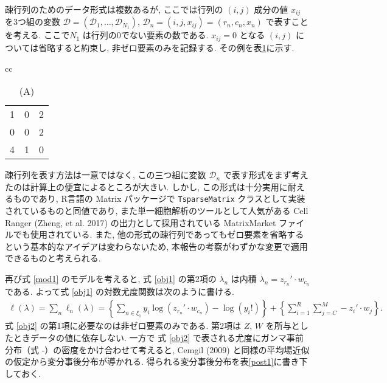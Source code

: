 \documentclass[a4paper,12pt]{jsarticle} %
\numberwithin{equation}{section} %
\begin{document}
疎行列のためのデータ形式は複数あるが, ここでは行列の $(i,j)$ 成分の値 $x_{ij}$ を3つ組の変数 $\mathcal{D}=(\mathcal{D}_1, \ldots, \mathcal{D}_{N_1})$,  $ \mathcal{D}_n  = (i,j,x_{ij})=(r_n, c_n, x_n)$ で表すことを考える. ここで$N_1$ は行列の0でない要素の数である.  $x_{ij}=0$ となる $(i,j)$ については省略すると約束し, 非ゼロ要素のみを記録する. その例を表\ref{tab1}に示す. 
\begin{table}[tbp]
\centering
\caption{疎行列の例. (A)と(B)は同じ情報を持つ. (B)は本研究で扱う疎行列の形式である. }\label{tab1}
\begin{tabular}{cc}
\begin{subtable}{0.2\linewidth}\centering
{
\caption*{(A)}
\begin{tabular}{|ccc|}
\hline
1 & 0 & 2\\
0 & 0 & 2\\
4 & 1 & 0\\
\hline
\end{tabular}
}
\end{subtable}
\begin{subtable}{0.2\linewidth}
\end{subtable}
\end{tabular}
\end{table}
疎行列を表す方法は一意ではなく, この三つ組に変数 $\mathcal{D}_n$ で表す形式をまず考えたのは計算上の便宜によるところが大きい. しかし, この形式は十分実用に耐えるものであり, R言語の Matrix パッケージで \verb|TsparseMatrix| クラスとして実装されているものと同値であり, また単一細胞解析のツールとして人気がある Cell Ranger (Zheng, et al. 2017) の出力として採用されている MatrixMarket ファイルでも使用されている. また, 他の形式の疎行列であってもゼロ要素を省略するという基本的なアイデアは変わらないため, 本報告の考察がわずかな変更で適用できるものと考えられる.

再び式 \eqref{mod1} のモデルを考えると, 式 \eqref{obj1} の第2項の $\lambda_n$ は内積 $\lambda_n = z_{r_n}' \cdot w_{c_n}$ である.
よって式 \eqref{obj1} の対数尤度関数は次のように書ける. 
\begin{align}
\ell (\lambda) = \sum_n \ell_n (\lambda) = \left\{ \sum_{n \in \xi_1} y_i \log(z_{r_n}' \cdot w_{c_n})  - \log(y_i!) \right\} + \left\{  \sum_{i=1}^{R}\sum_{j=C}^M  -  z_{i}' \cdot w_{j}\right\}. \label{obj2}
\end{align}
式 \eqref{obj2} の第1項に必要なのは非ゼロ要素のみである.
第2項は $Z$, $W$ を所与としたときデータの値に依存しない.
一方で 式 \eqref{obj2} で表される尤度にガンマ事前分布（式 -）の密度をかけ合わせて考えると,  Cemgil (2009) と同様の平均場近似の仮定から変分事後分布が導かれる. 得られる変分事後分布を表\ref{post1}に書き下しておく.
\end{document}
